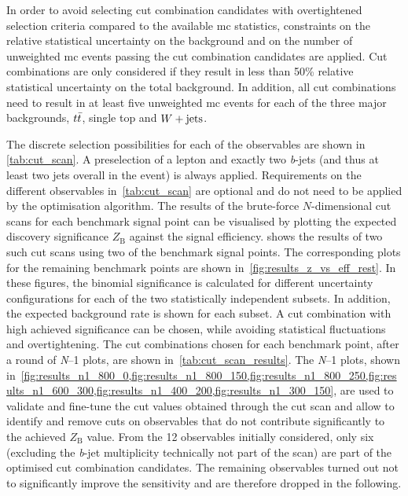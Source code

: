 In order to avoid selecting cut combination candidates with overtightened selection criteria compared to the available \gls{mc} statistics, constraints on the relative statistical uncertainty on the background and on the number of unweighted \gls{mc} events passing the cut combination candidates are applied.
Cut combinations are only considered if they result in less than 50\% relative statistical uncertainty on the total background.
In addition, all cut combinations need to result in at least five unweighted \gls{mc} events for each of the three major backgrounds, $t\bar{t}$, single top and $W+\mathrm{jets}$.

The discrete selection possibilities for each of the observables are shown in \cref{tab:cut_scan}.
A preselection of a lepton and exactly two \textit{b}-jets (and thus at least two jets overall in the event) is always applied. Requirements on the different observables in~\cref{tab:cut_scan} are optional and do not need to be applied by the optimisation algorithm.
The results of the brute-force $N$-dimensional cut scans for each benchmark signal point can be visualised by plotting the expected discovery significance $Z_\mathrm{B}$ against the signal efficiency.
 shows the results of two such cut scans using two of the benchmark signal points.
The corresponding plots for the remaining benchmark points are shown in~\cref{fig:results_z_vs_eff_rest}. In these figures, the binomial significance is calculated for different uncertainty configurations for each of the two statistically independent subsets.
In addition, the expected background rate is shown for each subset.
A cut combination with high achieved significance can be chosen, while avoiding statistical fluctuations and overtightening.
The cut combinations chosen for each benchmark point, after a round of \textit{N}--1 plots, are shown in~\cref{tab:cut_scan_results}. The \textit{N}--1 plots, shown in~\cref{fig:results_n1_800_0,fig:results_n1_800_150,fig:results_n1_800_250,fig:results_n1_600_300,fig:results_n1_400_200,fig:results_n1_300_150}, are used to validate and fine-tune the cut values obtained through the cut scan and allow to identify and remove cuts on observables that do not contribute significantly to the achieved $Z_\mathrm{B}$ value.
From the 12 observables initially considered, only six (excluding the \textit{b}-jet multiplicity technically not part of the scan) are part of the optimised cut combination candidates.
The remaining observables turned out not to significantly improve the sensitivity and are therefore dropped in the following.


